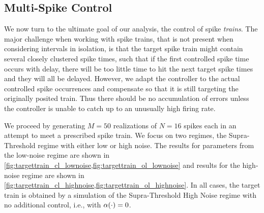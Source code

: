 
\clearpage

\subsection{Multi-Spike Control}
We now turn to the ultimate goal of our analysis, the control of spike {\sl
trains}. The major challenge when working with spike trains, that is not
present when considering intervals in isolation, is that the target spike train
might contain several closely clustered spike times, such that if
the first controlled spike time occurs with delay, there will be too little time
to hit the next target spike times and they will all be
delayed. However, we adapt the controller to the actual controlled spike
occurrences and compensate so that it is still targeting the originally posited train. Thus there should be no accumulation of errors unless
the controller is unable to catch up to an unusually high firing rate.

We proceed by generating $M=50$ realizations of $N=16$ spikes
each in an attempt to meet a prescribed spike train. We focus on two
regimes, the Supra-Threshold regime with either low or high noise. The results
for parameters from the low-noise regime are shown in
\cref{fig:targettrain_cl_lownoise,fig:targettrain_ol_lownoise} and
results for the high-noise regime are shown in
\cref{fig:targettrain_cl_highnoise,fig:targettrain_ol_highnoise}. In all cases,
the target train is obtained by a simulation of the Supra-Threshold High Noise
regime with no additional control, i.e., with $\alpha(\cdot) = 0$.

